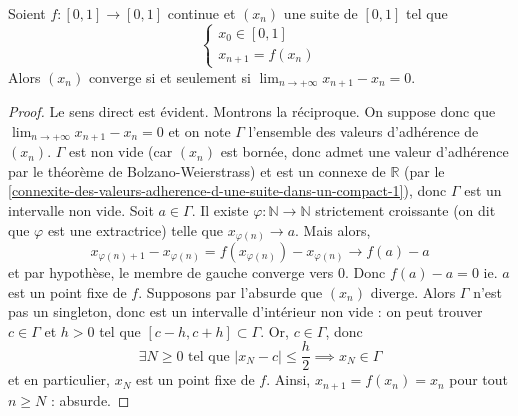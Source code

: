 
	\begin{application}
		Soient $f : [0, 1] \rightarrow [0, 1]$ continue et $(x_n)$ une suite de $[0, 1]$ tel que
		\[ \begin{cases} x_0 \in [0, 1] \\ x_{n+1} = f(x_n) \end{cases} \]
		Alors $(x_n)$ converge si et seulement si $\lim_{n \rightarrow +\infty } x_{n+1} - x_n = 0$.
	\end{application}

	\begin{proof}
		Le sens direct est évident. Montrons la réciproque. On suppose donc que $\lim_{n \rightarrow +\infty } x_{n+1} - x_n = 0$ et on note $\Gamma$ l'ensemble des valeurs d'adhérence de $(x_n)$. $\Gamma$ est non vide (car $(x_n)$ est bornée, donc admet une valeur d'adhérence par le théorème de Bolzano-Weierstrass) et est un connexe de $\mathbb{R}$ (par le \cref{connexite-des-valeurs-adherence-d-une-suite-dans-un-compact-1}), donc $\Gamma$ est un intervalle non vide.
		\newpar
		Soit $a \in \Gamma$. Il existe $\varphi : \mathbb{N} \rightarrow \mathbb{N}$ strictement croissante (on dit que $\varphi$ est une extractrice) telle que $x_{\varphi(n)} \longrightarrow a$. Mais alors,
		\[ x_{\varphi(n) + 1} - x_{\varphi(n)} = f(x_{\varphi(n)}) - x_{\varphi(n)} \longrightarrow f(a) - a \]
		et par hypothèse, le membre de gauche converge vers $0$. Donc $f(a) - a = 0$ ie. $a$ est un point fixe de $f$.
		\newpar
		Supposons par l'absurde que $(x_n)$ diverge. Alors $\Gamma$ n'est pas un singleton, donc est un intervalle d'intérieur non vide : on peut trouver $c \in \Gamma$ et $h > 0$ tel que $[c - h, c + h] \subset \Gamma$.
		\newpar
		Or, $c \in \Gamma$, donc
		\[ \exists N \geq 0 \text{ tel que } |x_N - c| \leq \frac{h}{2} \implies x_N \in \Gamma \]
		et en particulier, $x_N$ est un point fixe de $f$. Ainsi, $x_{n+1} = f(x_n) = x_n$ pour tout $n \geq N$ : absurde.
	\end{proof}

